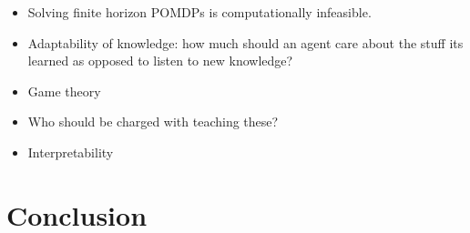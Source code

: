 \documentclass[11pt]{article}
\begin{document}
\begin{itemize}
\item Solving finite horizon POMDPs is computationally infeasible.
\item Adaptability of knowledge: how much should an agent care about the stuff its learned as opposed to listen to new knowledge?
\item Game theory
\item Who should be charged with teaching these?
\item Interpretability
\end{itemize}



\section{Conclusion}




\end{document}
